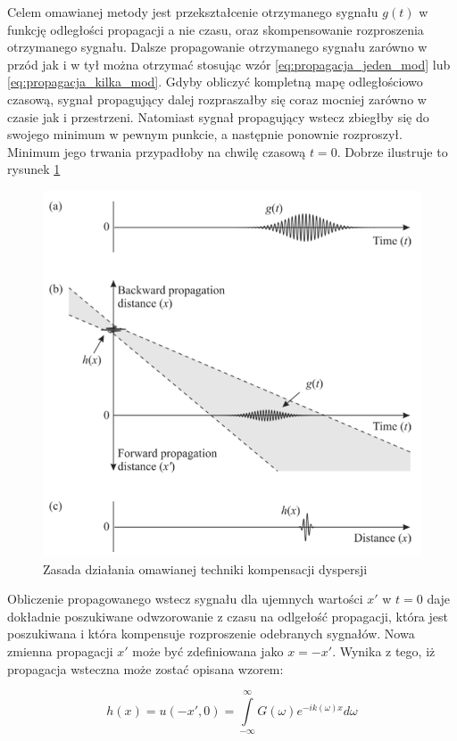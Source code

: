 Celem omawianej metody jest przekształcenie otrzymanego sygnału $g(t)$ w funkcję odległości propagacji a nie czasu, oraz skompensowanie rozproszenia otrzymanego sygnału. Dalsze propagowanie otrzymanego sygnału zarówno w przód jak i w tył można otrzymać stosując wzór \ref{eq:propagacja_jeden_mod} lub \ref{eq:propagacja_kilka_mod}. Gdyby obliczyć kompletną mapę odległościowo czasową, sygnał propagujący dalej rozpraszałby się coraz mocniej zarówno w czasie jak i przestrzeni. Natomiast sygnał propagujący wstecz zbiegłby się do swojego minimum w pewnym punkcie, a następnie ponownie rozproszył. Minimum jego trwania przypadłoby na chwilę czasową $t=0$. Dobrze ilustruje to rysunek \ref{fig:Wilcox_propaguje}
\begin{figure}[h]
\centering
\includegraphics[width=14cm]{Zdjecia/4/Wilcox_zasada_dzial}
\caption{Zasada działania omawianej techniki kompensacji dyspersji \cite{kasia1}}
\label{fig:Wilcox_propaguje}
\end{figure}
Obliczenie propagowanego wstecz sygnału dla ujemnych wartości $x'$ w $t=0$ daje dokładnie poszukiwane odwzorowanie z czasu na odlgełość propagacji, która jest poszukiwana i która kompensuje rozproszenie odebranych sygnałów. Nowa zmienna propagacji $x'$ może być zdefiniowana jako $x=-x'$. Wynika z tego, iż propagacja wsteczna może zostać opisana wzorem:

\begin{equation}
h(x) = u(-x',0) = \int \limits_{-\infty}^{\infty}G(\omega)e^{-ik(\omega)x}d\omega \label{eq:wsteczna propagacja}
\end{equation}

